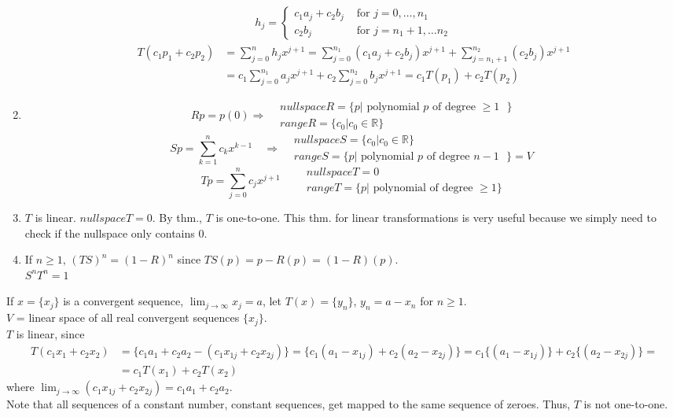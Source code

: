 \documentclass[twoside]{amsart}
\theoremstyle{plain}
\theoremstyle{definition}
\newcommand{\exercisehead}[1]
  {
   \noindent{\small\bf Exercise #1.}
   \smallskip}
\begin{document}
\begin{enumerate}
\[\begin{gathered}
  h_j = \begin{cases} c_1 a_j + c_2 b_j & \text{ for } j = 0, \dots , n_1 \\
    c_2 b_j & \text{ for } j = n_1 + 1, \dots n_2 
\end{cases} 
\end{gathered}
\]
\[
\begin{aligned}
  T(c_1p_1 + c_2 p_2) & = \sum_{j=0}^n h_j  x^{j+1} = \sum_{j=0}^{n_1} (c_1 a_j + c_2 b_j) x^{j+1} + \sum_{j=n_1+1}^{n_2} (c_2 b_j) x^{j+1} \\
  & = c_1 \sum_{j=0}^{n_1} a_j x^{j+1} + c_2 \sum_{j=0}^{n_2} b_j x^{j+1} = c_1 T(p_1) + c_2 T(p_2) 
\end{aligned}
\]
\item 
\[
Rp = p(0)  \Longrightarrow \begin{aligned}
  & nullspace{R} = \{ p | \text{ polynomial $p$ of degree $\geq 1$ } \} \\
  & range{R} = \{ c_0 | c_0 \in \mathbb{R} \}
\end{aligned}
\]
\[
Sp = \sum_{k=1}^n c_k x^{k-1} \quad \Longrightarrow \begin{aligned}
  & nullspace{S} = \{ c_0 | c_0 \in \mathbb{R} \} \\
  & range{S} = \{ p | \text{ polynomial $p$ of degree $n-1$ } \} = V 
\end{aligned}
\]
\[
Tp = \sum_{j=0}^n c_j x^{j+1} \quad \, \begin{aligned}
  & nullspace{T}  = 0 \\
  & range{T}  = \{ p | \text{ polynomial of degree } \geq 1 \}
\end{aligned}
\]
\item $T$ is linear.  $nullspace{T} = 0$.  By thm., $T$ is one-to-one.  This thm. for linear transformations is very useful because we simply need to check if the nullspace only contains $0$.  
\item If $n\geq 1$, $(TS)^n = \boxed{ (1-R)^n }$ since $TS(p) = p - R(p) = (1-R)(p)$.  \\
  $S^n T^n = 1$  
\end{enumerate}
\exercisehead{32} If $x = \{ x_j \}$ is a convergent sequence, $\lim_{j \to \infty} x_j = a$, let $T(x) = \{ y_n \}$, $y_n = a-x_n$ for $n\geq 1 $.  \\$V$ = linear space of all real convergent sequences $\{ x_j \}$.   \\
$T$ is linear, since 
\[
\begin{aligned}
T(c_1 x_1 + c_2 x_2) & = \{ c_1 a_1 + c_2 a_2 - (c_1 x_{1j} + c_2 x_{2j} ) \}= \{ c_1 ( a_1 - x_{1j}) + c_2 (a_2 - x_{2j}) \} = c_1 \{ (a_1 - x_{1j} ) \} + c_2 \{ (a_2 - x_{2j} ) \} = \\
& = c_1 T(x_1) + c_2 T(x_2) 
\end{aligned}
\]
where $\lim_{j\to \infty} (c_1 x_{1j} + c_2 x_{2j} ) = c_1 a_1 + c_2 a_2 $.   \\
Note that all sequences of a constant number, constant sequences, get mapped to the same sequence of zeroes.  Thus, $T$ is not one-to-one.  
\end{document}
